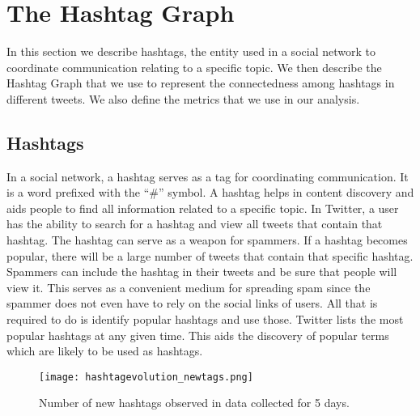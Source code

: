 \documentclass[journal, a4paper, 12pt]{article}
\begin{document}

    
\section{The Hashtag Graph }

In this section we describe hashtags, the entity used in a social network to coordinate communication relating to a specific topic. We then describe the Hashtag Graph that we use to represent the connectedness among hashtags in different tweets. We also define the metrics that we use in our analysis.

\subsection{Hashtags}
In a social network, a hashtag serves as a tag for coordinating communication. It is  a word prefixed with the ``\#'' symbol. A hashtag helps in content discovery and aids people to find all information related to a specific topic. In Twitter, a user has the ability to search for a hashtag and view all tweets that contain that hashtag. The hashtag can serve as a weapon for spammers. If a hashtag becomes popular, there will be a large number of tweets that contain that specific hashtag. Spammers can include the hashtag in their tweets and be sure that people will view it. This serves as a convenient medium for spreading spam since the spammer does not even have to rely on the social links of users. All that is required to do is identify popular hashtags and use those. Twitter lists the most popular hashtags at any given time. This aids the discovery of popular terms which are likely to be used as hashtags.\\

    	\begin{figure}[!hbt]
		\begin{center}
		\texttt{[image: hashtagevolution\_newtags.png]}
		\caption{Number of new hashtags observed in data collected for 5 days.}
		\label{fig:hashtagevolution}
		\end{center}
	\end{figure}
\end{document}
